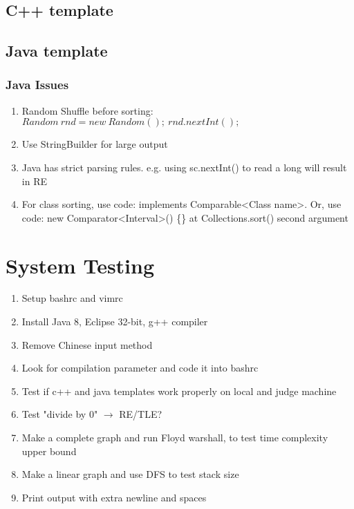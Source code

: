\documentclass[10pt,oneside]{article}
\begin{document}
\begin{landscape}
\begin{multicols}{2}
\subsection{C++ template}


\subsection{Java template}


\subsubsection{Java Issues}
\begin{enumerate}
	\item Random Shuffle before sorting: $Random\ rnd = new\ Random();\ rnd.nextInt();$
	\item Use StringBuilder for large output
	\item Java has strict parsing rules. e.g. using sc.nextInt() to read a long will result in RE
	\item For class sorting, use code: implements Comparable<Class name>. Or, use code: new Comparator<Interval>() \{\} at Collections.sort() second argument
\end{enumerate}

\section{System Testing}

\begin{enumerate}
	\item Setup bashrc and vimrc
	\item Install Java 8, Eclipse 32-bit, g++ compiler
	\item Remove Chinese input method
	\item Look for compilation parameter and code it into bashrc
	\item Test if c++ and java templates work properly on local and judge machine
	\item Test "divide by 0" $\rightarrow$ RE/TLE?
	\item Make a complete graph and run Floyd warshall, to test time complexity upper bound
	\item Make a linear graph and use DFS to test stack size
	\item Print output with extra newline and spaces
\end{enumerate}


\end{multicols}
\end{landscape}
\end{document}
